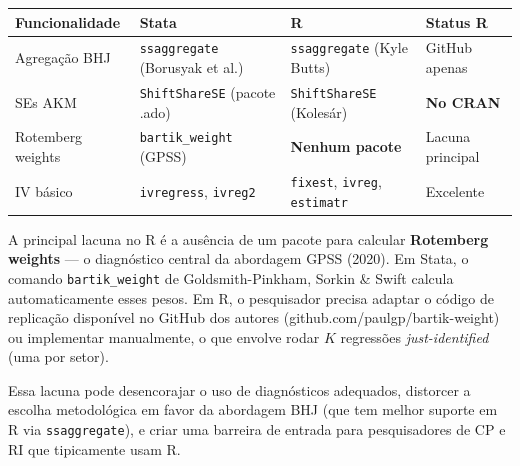 \documentclass[
]{article}
\begin{document}
\begin{longtable}[]{@{}
  >{\raggedright\arraybackslash}p{}
  >{\raggedright\arraybackslash}p{}
  >{\raggedright\arraybackslash}p{}
  >{\raggedright\arraybackslash}p{}@{}}
\toprule\noalign{}
\begin{minipage}[b]{\linewidth}\raggedright
Funcionalidade
\end{minipage} & \begin{minipage}[b]{\linewidth}\raggedright
Stata
\end{minipage} & \begin{minipage}[b]{\linewidth}\raggedright
R
\end{minipage} & \begin{minipage}[b]{\linewidth}\raggedright
Status R
\end{minipage} \\
\midrule\noalign{}
\endhead
\bottomrule\noalign{}
\endlastfoot
Agregação BHJ & \texttt{ssaggregate} (Borusyak et al.) & \texttt{ssaggregate} (Kyle Butts) & GitHub apenas \\
SEs AKM & \texttt{ShiftShareSE} (pacote .ado) & \texttt{ShiftShareSE} (Kolesár) & \textbf{No CRAN} \\
Rotemberg weights & \texttt{bartik\_weight} (GPSS) & \textbf{Nenhum pacote} & Lacuna principal \\
IV básico & \texttt{ivregress}, \texttt{ivreg2} & \texttt{fixest}, \texttt{ivreg}, \texttt{estimatr} & Excelente \\
\end{longtable}

A principal lacuna no R é a ausência de um pacote para calcular \textbf{Rotemberg weights} --- o diagnóstico central da abordagem GPSS (2020). Em Stata, o comando \texttt{bartik\_weight} de Goldsmith-Pinkham, Sorkin \& Swift calcula automaticamente esses pesos. Em R, o pesquisador precisa adaptar o código de replicação disponível no GitHub dos autores (github.com/paulgp/bartik-weight) ou implementar manualmente, o que envolve rodar \(K\) regressões \emph{just-identified} (uma por setor).

Essa lacuna pode desencorajar o uso de diagnósticos adequados, distorcer a escolha metodológica em favor da abordagem BHJ (que tem melhor suporte em R via \texttt{ssaggregate}), e criar uma barreira de entrada para pesquisadores de CP e RI que tipicamente usam R.
\end{document}
